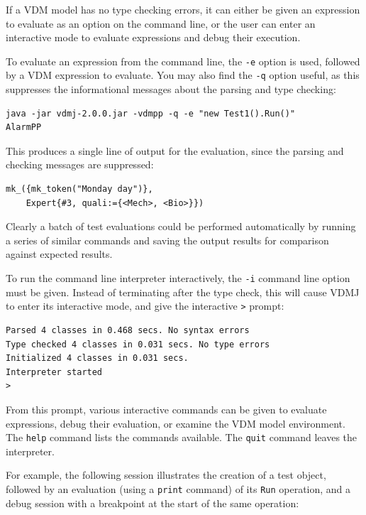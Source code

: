 If a VDM model has no type checking errors, it can either be given
an expression to evaluate as an option on the command line, or the
user can enter an interactive mode to evaluate expressions and debug
their execution.

To evaluate an expression from the command line, the \verb|-e| option
is used, followed by a VDM expression to evaluate. You may also find
the \verb|-q| option useful, as this suppresses the informational
messages about the parsing and type checking:

\begin{lstlisting}
java -jar vdmj-2.0.0.jar -vdmpp -q -e "new Test1().Run()" 
AlarmPP
\end{lstlisting}

\noindent This produces a single line of output for the evaluation, since the
parsing and checking messages are suppressed:

\begin{lstlisting}
mk_({mk_token("Monday day")},
	Expert{#3, quali:={<Mech>, <Bio>}})
\end{lstlisting}

Clearly a batch of test evaluations could be performed automatically by running
a series of similar commands and saving the output results for comparison
against expected results.

To run the command line interpreter interactively, the \verb|-i| command line
option must be given. Instead of terminating after the type check, this will
cause VDMJ to enter its interactive mode, and give the interactive \verb|>|
prompt:

\begin{lstlisting}
Parsed 4 classes in 0.468 secs. No syntax errors
Type checked 4 classes in 0.031 secs. No type errors
Initialized 4 classes in 0.031 secs. 
Interpreter started
>  
\end{lstlisting}

\noindent From this prompt, various interactive commands can be given to
evaluate expressions, debug their evaluation, or examine the VDM model environment.
The \verb|help| command lists the commands available. The \verb|quit| command
leaves the interpreter.

For example, the following session illustrates the creation of a test object,
followed by an evaluation (using a \texttt{print} command)
of its \verb|Run| operation, and a debug
session with a breakpoint at the start of the same operation:


